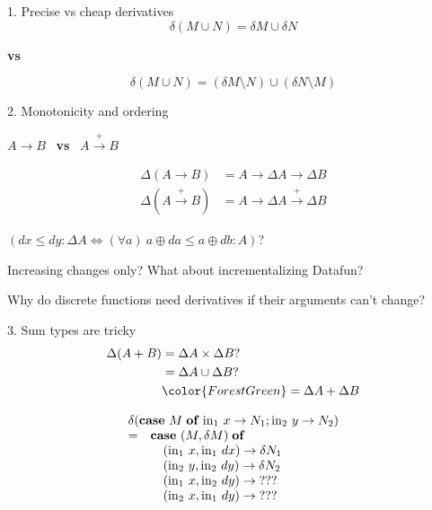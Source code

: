 \documentclass[dvipsnames]{beamer}
\newcommand\x\times
\newcommand\D\Delta
\newcommand\kw[1]{\ensuremath{\mathbf{#1}}}
\newcommand\fname[1]{\ensuremath{\mathrm{#1}}}
\begin{document}
\begin{frame}{1. Precise vs cheap derivatives}
  \Large\centering
  \[\delta(M \cup N) = \delta M \cup \delta N\]

  \textbf{vs}

  \[\delta(M \cup N) = (\delta M \setminus N) \cup (\delta N \setminus M)\]
\end{frame}

\newcommand\mto{\overset{+}{\to}}
\begin{frame}{2. Monotonicity and ordering}\Large
  {\centering
  $A \to B$ ~\textbf{vs}~ $A \mto B$

  \begin{align*}
    \D(A \to B) &= A \to \D A \to \D B\\
    \D(A \mto B) &= A \to \D A \mto \D B
  \end{align*}

  $(dx \le dy : \D A \iff (\forall a)~ a \oplus da \le a \oplus db : A)$?
  \par}

  \vspace{1em}\large
  Increasing changes only? What about incrementalizing Datafun?

  \vspace{1em}
  Why do discrete functions need derivatives if their arguments can't change?

\end{frame}

\begin{frame}{3. Sum types are tricky}
  \Large
  \begin{align*}
    \D(A + B) &= \D A \x \D B ?\\
    &= \D A \cup \D B ?\\
    &\color{ForestGreen} = \D A + \D B
  \end{align*}

  \[\begin{array}{ll}
    \multicolumn{2}{l}{\delta(\kw{case}~ M \mathrel{\kw{of}}
    \fname{in}_1~x \to N_1; \fname{in}_2~y \to N_2)}\\
    =& \kw{case}~ (M, \delta M) \mathrel{\kw{of}}\\
    & \quad(\fname{in}_1~x, \fname{in}_1~dx) \to \delta N_1\\
    & \quad(\fname{in}_2~y, \fname{in}_2~dy) \to \delta N_2\\
    & \quad(\fname{in}_1~x, \fname{in}_2~dy) \to {???}\\
    & \quad(\fname{in}_2~x, \fname{in}_1~dy) \to {???}
  \end{array}\]
\end{frame}
\end{document}
